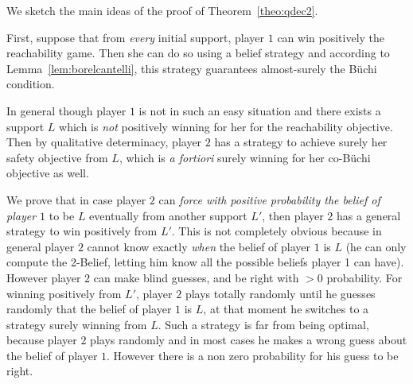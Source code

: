 
\smallskip
We sketch the main ideas of the proof of Theorem~\ref{theo:qdec2}.


First, suppose that from \emph{every} initial support, player $1$ can
win positively the  reachability game.
{Then she can do so using a belief strategy and according to Lemma~\ref{lem:borelcantelli},}
this strategy guarantees
almost-surely the B\"uchi condition.

In general though player $1$ is not in such an easy situation and
there exists a support $L$ which is \emph{not} positively winning
for her for the reachability objective.
Then by qualitative determinacy, player $2$ has a strategy to achieve surely her safety objective
from $L$, which is \emph{a fortiori}
surely winning for her co-B\"uchi objective as well.


We prove that in case player $2$ can \emph{force with positive
  probability the belief of player $1$} to be $L$ eventually from another
support $L'$, then player $2$
{ has a general strategy to win positively from $L'$}.
This is not completely obvious because in general player $2$ cannot
know exactly \emph{when} the belief of player $1$ is $L$ (he can only
compute the 2-Belief, letting him know all the possible beliefs player
1 can have).  However player $2$ can make blind guesses,
and be right with $>0$ probability.
For winning positively from $L'$, player $2$ plays
totally randomly until he guesses randomly that the belief of player
$1$ is $L$, at that moment he switches to a strategy surely winning
from $L$.  Such a strategy is far from being optimal, because player
$2$ plays randomly and in most cases he makes a wrong guess about the
belief of player $1$.  However 
there is a non zero probability for his guess to be right.

